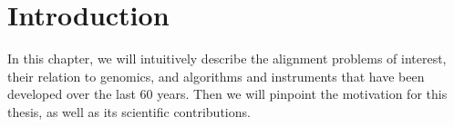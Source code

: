 \graphicspath{{\dir/}}


\chapter*{Introduction} \label{ch:introduction}

In this chapter, we will intuitively describe the alignment problems of
interest, their relation to genomics, and algorithms and instruments that have
been developed over the last 60 years. Then we will pinpoint the motivation for
this thesis, as well as its scientific contributions.





